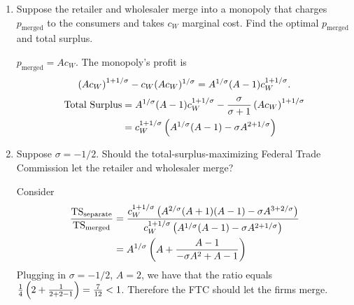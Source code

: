 \documentclass[11pt]{article}
\begin{document}
\begin{enumerate}
     \item Suppose the retailer and wholesaler merge into a monopoly that charges $p_{\text{merged}}$ to the consumers and takes $c_W$ marginal cost. Find the optimal $p_{\text{merged}}$ and total surplus.  
     \begin{sol}
         $p_{\text{merged}} = Ac_W.$ The monopoly's profit is \[
         \left({Ac_W}\right)^{1+1/\sigma} - c_W (Ac_W)^{1/\sigma} = A^{1/\sigma}(A-1) c_W^{1+1/\sigma}. 
         \]
         \begin{align*}
         \text{Total Surplus} &=    A^{1/\sigma}(A-1) c_W^{1+1/\sigma} - \frac{\sigma}{\sigma+1} \left({Ac_W}\right)^{1+1/\sigma} \\
         &= c_W^{1+1/\sigma} \left({A^{1/\sigma}(A-1) -\sigma A^{2+1/\sigma}}\right)
         \end{align*}
         
     \end{sol}
     \item Suppose $\sigma = -1/2$. Should the total-surplus-maximizing Federal Trade Commission let the retailer and wholesaler merge?
     
    \begin{sol}
             Consider \begin{align*}
             \frac{\text{TS}_\text{separate}}{\text{TS}_{\text{merged}}} &= \frac{ c_W^{1+1/\sigma} \left({A^{2/\sigma} (A+1)(A-1) - \sigma A^{3+2/\sigma}}\right)}{c_W^{1+1/\sigma} \left({A^{1/\sigma}(A-1) -\sigma A^{2+1/\sigma}}\right)}\\
             &= A^{1/\sigma} \left({A + \frac{A-1}{-\sigma A^2 + A -1}}\right) \\
             \end{align*}
            Plugging in $\sigma = -1/2$, $A = 2$, we have that the ratio equals $\frac{1}{4}\left({2 + \frac{1}{2 + 2 - 1}}\right) = \frac{7}{12} < 1$. Therefore the FTC should let the firms merge. 
         \end{sol}     
    

\end{enumerate}
\end{document}

